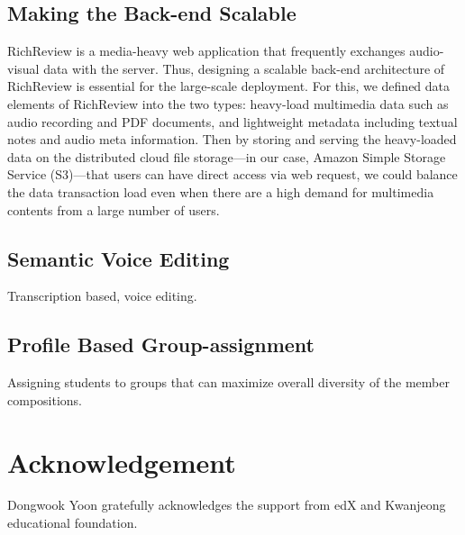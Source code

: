 \documentclass{sigchi}
\begin{document}
\subsection{Making the Back-end Scalable}
RichReview is a media-heavy web application that frequently exchanges audio-visual data with the server.
Thus, designing a scalable back-end architecture of RichReview is essential for the large-scale deployment.
For this, we defined data elements of RichReview into the two types: heavy-load multimedia data such as audio recording and PDF documents, and lightweight metadata including textual notes and audio meta information.
Then by storing and serving the heavy-loaded data on the distributed cloud file storage---in our case, Amazon Simple Storage Service (S3)---that users can have direct access via web request, we could balance the data transaction load even when there are a high demand for multimedia contents from a large number of users.

\subsection{Semantic Voice Editing}
Transcription based, voice editing.

\subsection{Profile Based Group-assignment}
Assigning students to groups that can maximize overall diversity of the member compositions.

\section{Acknowledgement} 
Dongwook Yoon gratefully acknowledges the support from edX and Kwanjeong educational foundation.




\end{document}
